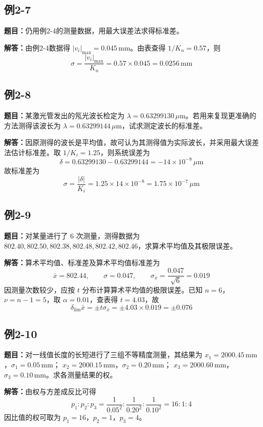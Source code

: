 \documentclass[UTF8,zihao=-4]{ctexart}
\newcommand{\problem}[1]{\subsection*{#1}}
\newcommand{\timu}{\noindent\textbf{题目：}}
\newcommand{\jieda}{\noindent\textbf{解答：}}
\begin{document}
\problem{例2-7}
\timu 仍用例2-4的测量数据，用最大误差法求得标准差。

\jieda 由例2-4数据得 $|v_i|_{\max}=0.045\,\mathrm{mm}$。由表查得 $1/K_n=0.57$，则
\begin{equation*}
    \sigma=\frac{|v_i|_{\max}}{K_n}=0.57\times0.045=0.0256\,\mathrm{mm}
\end{equation*}

\problem{例2-8}
\timu 某激光管发出的氖光波长检定为 $\lambda=0.63299130\,\mu\mathrm{m}$。若用来复现更准确的方法测得该波长为 $\lambda=0.63299144\,\mu\mathrm{m}$，试求测定波长的标准差。

\jieda 因原测得的波长是平均值，故可认为其测得值为实际波长，并采用最大误差法估计标准差。取 $1/K_i=1.25$，则系统误差为
\begin{equation*}
    \delta=0.63299130-0.63299144=-14\times10^{-8}\,\mu\mathrm{m}
\end{equation*}
故标准差为
\begin{equation*}
    \sigma=\frac{|\delta|}{K_i}=1.25\times14\times10^{-8}=1.75\times10^{-7}\,\mu\mathrm{m}
\end{equation*}

\newpage

\problem{例2-9}
\timu 对某量进行了 $6$ 次测量，测得数据为 $802.40,802.50,802.38,802.48,802.42,802.46$，求算术平均值及其极限误差。

\jieda 算术平均值、标准差及算术平均值标准差为
\begin{equation*}
    \bar{x}=802.44,
    \qquad
    \sigma=0.047,
    \qquad
    \sigma_{\bar{x}}=\frac{0.047}{\sqrt{6}}=0.019
\end{equation*}
因测量次数较少，应按 $t$ 分布计算算术平均值的极限误差。已知 $n=6$，$\nu=n-1=5$，取 $\alpha=0.01$，查表得 $t=4.03$，故
\begin{equation*}
    \delta_{\lim}\bar{x}=\pm t\sigma_{\bar{x}}=\pm4.03\times0.019=\pm0.076
\end{equation*}

\problem{例2-10}
\timu 对一线值长度的长短进行了三组不等精度测量，其结果为
$x_1=2000.45\,\mathrm{mm}$，$\sigma_1=0.05\,\mathrm{mm}$；
$x_2=2000.15\,\mathrm{mm}$，$\sigma_2=0.20\,\mathrm{mm}$；
$x_3=2000.60\,\mathrm{mm}$，$\sigma_3=0.10\,\mathrm{mm}$。求各测量结果的权。

\jieda 由权与方差成反比可得
\begin{equation*}
    p_1:p_2:p_3=\frac{1}{0.05^2}:\frac{1}{0.20^2}:\frac{1}{0.10^2}=16:1:4
\end{equation*}
因比值的权可取为 $p_1=16$，$p_2=1$，$p_3=4$。
\end{document}
